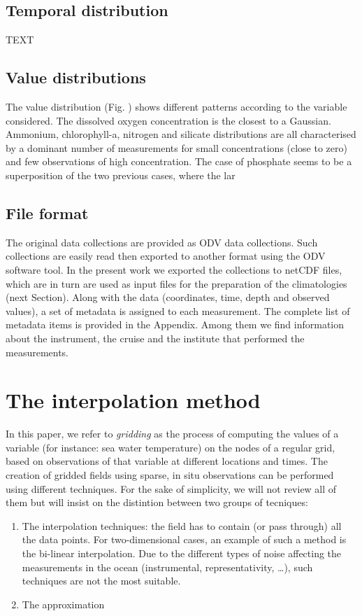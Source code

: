 \documentclass[essd, manuscript]{copernicus}
\begin{document}
\subsection{Temporal distribution}
TEXT

\subsection{Value distributions}

The value distribution (Fig. ) shows different patterns according to the variable considered. The dissolved oxygen concentration is the closest to a Gaussian. Ammonium, chlorophyll-a, nitrogen and silicate distributions are all characterised by a dominant number of measurements for small concentrations (close to zero) and few observations of high concentration. The case of phosphate seems to be a superposition of the two previous cases, where the lar







\subsection{File format}
The original data collections are provided as ODV \citep[Ocean Data View,][]{SCHLITZER02} data collections. Such collections are easily read then exported to another format using the ODV software tool. In the present work we exported the collections to netCDF files, which are in turn are used as input files for the preparation of the climatologies (next Section). 
Along with the data (coordinates, time, depth and observed values), a set of metadata is assigned to each measurement. The complete list of metadata items is provided in the Appendix. Among them we find information about the instrument, the cruise and the institute that performed the measurements. 

\section{The interpolation method}

In this paper, we refer to \textit{gridding} as the process of computing the values of a variable (for instance: sea water temperature) on the nodes of a regular grid, based on observations of that variable at different locations and times.
The creation of gridded fields using sparse, in situ observations can be performed using different techniques. For the sake of simplicity, we will not review all of them but will insist on the distintion between two groups of tecniques:
\begin{enumerate}
\item The interpolation techniques: the field has to contain (or pass through) all the data points. For two-dimensional cases, an example of such a method is the bi-linear interpolation. Due to the different types of noise affecting the measurements in the ocean (instrumental, representativity, \ldots), such techniques are not the most suitable.
\item The approximation 
\end{enumerate}
\end{document}
